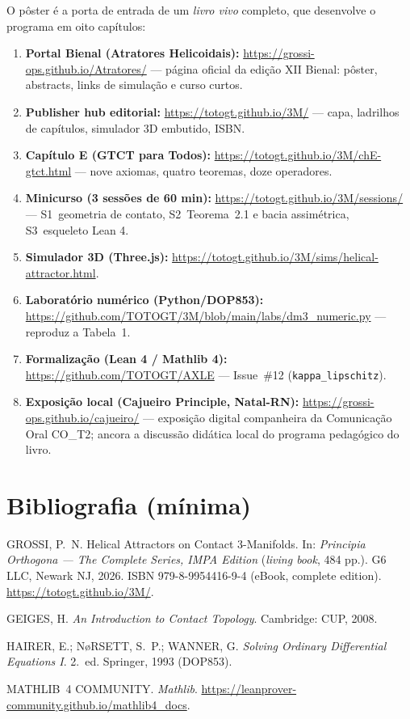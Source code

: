 \documentclass[11pt,a4paper]{article}
\begin{document}
O pôster é a porta de entrada de um \emph{livro vivo} completo, que desenvolve o programa em oito capítulos:

\begin{enumerate}[leftmargin=2em,itemsep=0.1em]
  \item \textbf{Portal Bienal (Atratores Helicoidais):} \url{https://grossi-ops.github.io/Atratores/} --- página oficial da edição XII Bienal: pôster, abstracts, links de simulação e curso curtos.
  \item \textbf{Publisher hub editorial:} \url{https://totogt.github.io/3M/} --- capa, ladrilhos de capítulos, simulador 3D embutido, ISBN.
  \item \textbf{Capítulo E (GTCT para Todos):} \url{https://totogt.github.io/3M/chE-gtct.html} --- nove axiomas, quatro teoremas, doze operadores.
  \item \textbf{Minicurso (3 sessões de 60 min):} \url{https://totogt.github.io/3M/sessions/} --- S1~geometria de contato, S2~Teorema~2.1 e bacia assimétrica, S3~esqueleto Lean 4.
  \item \textbf{Simulador 3D (Three.js):} \url{https://totogt.github.io/3M/sims/helical-attractor.html}.
  \item \textbf{Laboratório numérico (Python/DOP853):} \url{https://github.com/TOTOGT/3M/blob/main/labs/dm3_numeric.py} --- reproduz a Tabela~1.
  \item \textbf{Formalização (Lean 4 / Mathlib 4):} \url{https://github.com/TOTOGT/AXLE} --- Issue~\#12 (\texttt{kappa\_lipschitz}).
  \item \textbf{Exposição local (Cajueiro Principle, Natal-RN):} \url{https://grossi-ops.github.io/cajueiro/} --- exposição digital companheira da Comunicação Oral CO\_T2; ancora a discussão didática local do programa pedagógico do livro.
\end{enumerate}

\section*{Bibliografia (mínima)}

\begin{enumerate}[leftmargin=2em,itemsep=0em,label={[\arabic*]}]
  \item GROSSI, P.~N. Helical Attractors on Contact 3-Manifolds. In: \emph{Principia Orthogona --- The Complete Series, IMPA Edition} (\emph{living book}, 484 pp.). G6 LLC, Newark NJ, 2026. ISBN 979-8-9954416-9-4 (eBook, complete edition). \url{https://totogt.github.io/3M/}.
  \item GEIGES, H. \emph{An Introduction to Contact Topology}. Cambridge: CUP, 2008.
  \item HAIRER, E.; N\o{}RSETT, S.~P.; WANNER, G. \emph{Solving Ordinary Differential Equations I}. 2.~ed. Springer, 1993 (DOP853).
  \item MATHLIB~4 COMMUNITY. \emph{Mathlib}. \url{https://leanprover-community.github.io/mathlib4_docs}.
\end{enumerate}
\end{document}
